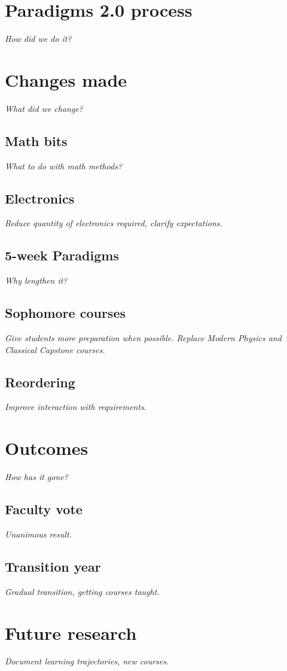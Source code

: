 \documentclass[english,aps,pra,reprint,noshowpacs,superscriptaddress]{revtex4-1}
\begin{document}
\section{Paradigms 2.0 process}
\emph{How did we do it?}

\section{Changes made}
\emph{What did we change?}

\subsection{Math bits}
\emph{What to do with math methods?}
\subsection{Electronics}
\emph{Reduce quantity of electronics required, clarify expectations.}
\subsection{5-week Paradigms}
\emph{Why lengthen it?}
\subsection{Sophomore courses}
\emph{Give students more preparation when possible.  Replace Modern
  Physics and Classical Capstone courses.}
\subsection{Reordering}
\emph{Improve interaction with requirements.}

\section{Outcomes}
\emph{How has it gone?}

\subsection{Faculty vote}
\emph{Unanimous result.}
\subsection{Transition year}
\emph{Gradual transition, getting courses taught.}

\section{Future research}
\emph{Document learning trajectories, new courses.}
\end{document}
